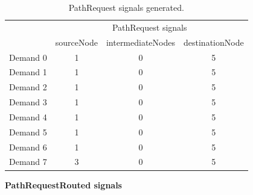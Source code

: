 \begin{table}[H]
	\centering
	\begin{tabular}{c|c|c|c|}
		\cline{2-4}
		\multicolumn{1}{l|}{}          & \multicolumn{3}{c|}{PathRequest signals}         \\ \cline{2-4} 
		\multicolumn{1}{l|}{}          & sourceNode & intermediateNodes & destinationNode \\ \hline
		\multicolumn{1}{|l|}{Demand 0} & 1          & 0                 & 5               \\ \hline
		\multicolumn{1}{|c|}{Demand 1} & 1          & 0                 & 5               \\ \hline
		\multicolumn{1}{|c|}{Demand 2} & 1          & 0                 & 5               \\ \hline
		\multicolumn{1}{|c|}{Demand 3} & 1          & 0                 & 5               \\ \hline
		\multicolumn{1}{|c|}{Demand 4} & 1          & 0                 & 5               \\ \hline
		\multicolumn{1}{|c|}{Demand 5} & 1          & 0                 & 5               \\ \hline
		\multicolumn{1}{|c|}{Demand 6} & 1          & 0                 & 5               \\ \hline
		\multicolumn{1}{|c|}{Demand 7} & 3          & 0                 & 5               \\ \hline
	\end{tabular}
	\caption{PathRequest signals generated.}
	\label{pathrequest_example}
\end{table}
\textbf{PathRequestRouted signals}
